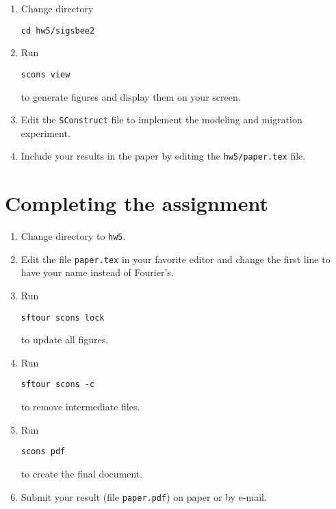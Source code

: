 \begin{enumerate}
    \begin{enumerate}
    \item Change directory 
\begin{verbatim}
cd hw5/sigsbee2
\end{verbatim}
    \item Run
\begin{verbatim}
scons view
\end{verbatim}
      to generate figures and display them on your screen.  
    \item Edit the \texttt{SConstruct} file to implement the modeling and migration experiment.
    \item Include your results in the paper by editing the \texttt{hw5/paper.tex} file.
    \end{enumerate}

\lstset{language=python,numbers=left,numberstyle=\tiny,showstringspaces=false}
{\small }

\end{enumerate}

\section{Completing the assignment}

\begin{enumerate}
\item Change directory to \texttt{hw5}.
\item Edit the file \texttt{paper.tex} in your favorite editor and change the
  first line to have your name instead of Fourier's.
\item Run
\begin{verbatim}
sftour scons lock
\end{verbatim}
to update all figures.
\item Run
\begin{verbatim}
sftour scons -c
\end{verbatim}
to remove intermediate files.
\item Run
\begin{verbatim} 
scons pdf
\end{verbatim}
to create the final document.
\item Submit your result (file \texttt{paper.pdf}) on paper or by
  e-mail. 
\end{enumerate}
